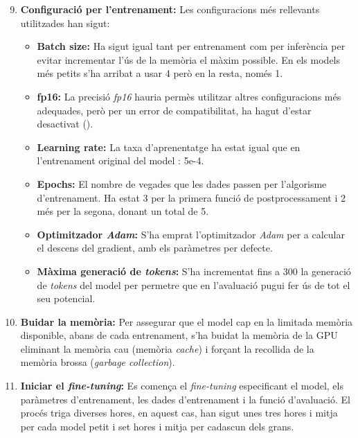 \begin{enumerate}
    \setcounter{enumi}{8}
    \item \textbf{Configuració per l'entrenament:} Les configuracions més rellevants utilitzades han sigut:
        \begin{itemize}
            \item \textbf{Batch size:} Ha sigut igual tant per entrenament com per inferència per evitar incrementar l'ús de la memòria el màxim possible. En els models més petits s'ha arribat a usar 4 però en la resta, només 1.
            \item \textbf{fp16:} La precisió \textit{fp16} hauria permès utilitzar altres configuracions més adequades, però per un error de compatibilitat, ha hagut d'estar desactivat ().
            \item \textbf{Learning rate:} La taxa d'aprenentatge ha estat igual que en l'entrenament original del model \cite{flan-t5}: 5e-4.
            \item \textbf{Epochs:} El nombre de vegades que les dades passen per l'algorisme d'entrenament. Ha estat 3 per la primera funció de postprocessament i 2 més per la segona, donant un total de 5.
            \item \textbf{Optimitzador \textit{Adam}:} S'ha emprat l'optimitzador \textit{Adam} per a calcular el descens del gradient, amb els paràmetres per defecte.
            \item \textbf{Màxima generació de \textit{tokens}:} S'ha incrementat fins a 300 la generació de \textit{tokens} del model per permetre que en l'avaluació pugui fer ús de tot el seu potencial.
        \end{itemize}
    \item \textbf{Buidar la memòria:} Per assegurar que el model cap en la limitada memòria disponible, abans de cada entrenament, s'ha buidat la memòria de la GPU eliminant la memòria cau (memòria \textit{cache}) i forçant la recollida de la memòria brossa (\textit{garbage collection}).
    \item \textbf{Iniciar el \textit{fine-tuning}:} Es comença el \textit{fine-tuning} especificant el model, els paràmetres d'entrenament, les dades d'entrenament i la funció d'avaluació. El procés triga diverses hores, en aquest cas, han sigut unes tres hores i mitja per cada model petit i set hores i mitja per cadascun dels grans.
\end{enumerate}
